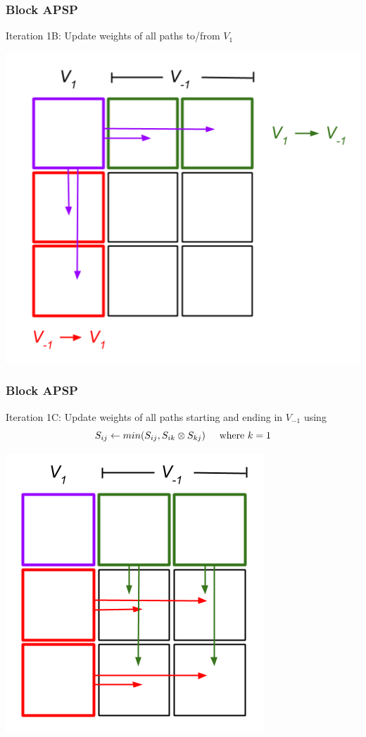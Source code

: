 \documentclass{beamer}
\begin{document}
\begin{frame}
\frametitle{Block APSP}
Iteration 1B: Update weights of all paths to/from $V_1$
\begin{center}
\includegraphics[scale = 0.4]{blockApsp-3.png}
\end{center}
\end{frame}

\begin{frame}
\frametitle{Block APSP}
Iteration 1C: Update weights of all paths starting and ending in $V_{-1}$ using
\[
S_{ij} \leftarrow min(S_{ij}, S_{ik} \otimes S_{kj}) \hspace{5mm} \text{where } k=1
\]
\begin{center}
\includegraphics[scale = 0.4]{blockApsp-4.png}
\end{center}
\end{frame}
\end{document}
